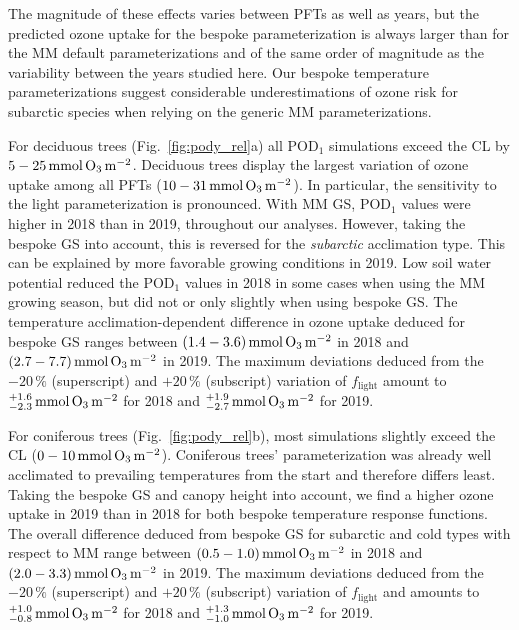 \documentclass[bg, manuscript]{copernicus}
\begin{document}
The magnitude of these effects varies between PFTs as well as years, but the predicted ozone uptake for the bespoke parameterization is always larger than for the MM default parameterizations and of the same order of magnitude as the variability between the years studied here. Our bespoke temperature parameterizations suggest considerable underestimations of ozone risk for subarctic species when relying on the generic MM parameterizations.

For deciduous trees (Fig.~\ref{fig:pody_rel}a) all $\mathrm{POD_1}$ simulations exceed the CL by $5-25\,\unit{mmol\,\chem{O_3}\,m^{-2}}$. Deciduous trees display the largest variation of ozone uptake among all PFTs ($10-31\,\unit{mmol\,\chem{O_3}\,m^{-2}}$). In particular, the sensitivity to the light parameterization is pronounced. With MM GS, $\mathrm{POD_1}$ values were higher in 2018 than in 2019, throughout our analyses. However, taking the bespoke GS into account, this is reversed for the \emph{subarctic} acclimation type. This can be explained by more favorable growing conditions in 2019. Low soil water potential reduced the $\mathrm{POD_1}$ values in 2018 in some cases when using the MM growing season, but did not or only slightly when using bespoke GS. The temperature acclimation-dependent difference in ozone uptake deduced for bespoke GS ranges between $(1.4-3.6)\,\unit{mmol\,\chem{O_3}\,m^{-2}}$ in 2018 and $(2.7-7.7)\,\unit{mmol\,\chem{O_3}\,m^{-2}}$ in 2019. The maximum deviations deduced from the $-20\,\unit{\%}$ (superscript) and $+20\,\unit{\%}$ (subscript) variation of $f_\mathrm{light}$ amount to $^{+1.6}_{-2.3}\,\unit{mmol\,\chem{O_3}\,m^{-2}}$ for 2018 and $^{+1.9}_{-2.7}\,\unit{mmol\,\chem{O_3}\,m^{-2}}$ for 2019. 

For coniferous trees (Fig.~\ref{fig:pody_rel}b), most simulations slightly exceed the CL ($0-10\,\unit{mmol\,\chem{O_3}\,m^{-2}}$). Coniferous trees' parameterization was already well acclimated to prevailing temperatures from the start and therefore differs least. Taking the bespoke GS and canopy height into account, we find a higher ozone uptake in 2019 than in 2018 for both bespoke temperature response functions. The overall difference deduced from bespoke GS for subarctic and cold types with respect to MM range between $(0.5-1.0)\,\unit{mmol\,\chem{O_3}\,m^{-2}}$ in 2018 and $(2.0-3.3)\,\unit{mmol\,\chem{O_3}\,m^{-2}}$ in 2019. The maximum deviations deduced from the $-20\,\unit{\%}$ (superscript) and $+20\,\unit{\%}$ (subscript) variation of $f_\mathrm{light}$ and amounts to $^{+1.0}_{-0.8}\,\unit{mmol\,\chem{O_3}\,m^{-2}}$ for 2018 and $^{+1.3}_{-1.0}\,\unit{mmol\,\chem{O_3}\,m^{-2}}$ for 2019.
\end{document}
